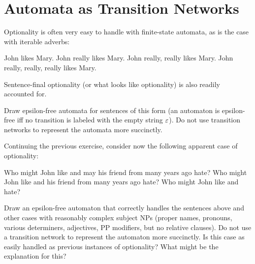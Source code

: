 \chapter{Automata as Transition Networks}
\label{cha:REGsyntax}

\begin{exercise}
    Optionality is often very easy to handle with finite-state automata, as is the case with iterable adverbs:
    \begin{exe}
        \ex
        \begin{xlist}
            \ex John likes Mary.
            \ex John really likes Mary.
            \ex John really, really likes Mary.
            \ex John really, really, really likes Mary.
        \end{xlist}
    \end{exe}
    Sentence-final optionality (or what looks like optionality) is also readily accounted for.
    \begin{exe}
        \ex
        \begin{xlist}
        \end{xlist}
        \ex
        \begin{xlist}
        \end{xlist}
    \end{exe}
    Draw epsilon-free automata for sentences of this form (an automaton is epsilon-free iff no transition is labeled with the empty string $\varepsilon$).
    Do not use transition networks to represent the automata more succinctly.
\end{exercise}

\begin{exercise}
    Continuing the previous exercise, consider now the following apparent case of optionality:
    \begin{exe}
        \ex
        \begin{xlist}
            \ex Who might John like and may his friend from many years ago hate?
            \ex Who might John like and his friend from many years ago hate?
            \ex Who might John like and hate?
        \end{xlist}
    \end{exe}
    Draw an epsilon-free automaton that correctly handles the sentences above and other cases with reasonably complex subject NPs (proper names, pronouns, various determiners, adjectives, PP modifiers, but no relative clauses).
    Do not use a transition network to represent the automaton more succinctly.
    Is this case as easily handled as previous instances of optionality?
    What might be the explanation for this?
\end{exercise}

